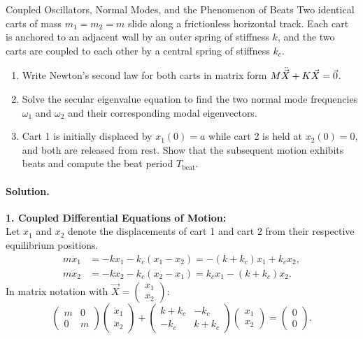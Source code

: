 \begin{workedexample}{Coupled Oscillators, Normal Modes, and the Phenomenon of Beats}
Two identical carts of mass $m_1 = m_2 = m$ slide along a frictionless horizontal track. Each cart is anchored to an adjacent wall by an outer spring of stiffness $k$, and the two carts are coupled to each other by a central spring of stiffness $k_c$.
\begin{enumerate}[leftmargin=1.4em,itemsep=3pt]
  \item Write Newton's second law for both carts in matrix form $M \ddot{\vec{X}} + K \vec{X} = \vec{0}$.
  \item Solve the secular eigenvalue equation to find the two normal mode frequencies $\omega_1$ and $\omega_2$ and their corresponding modal eigenvectors.
  \item Cart 1 is initially displaced by $x_1(0) = a$ while cart 2 is held at $x_2(0) = 0$, and both are released from rest. Show that the subsequent motion exhibits beats and compute the beat period $T_{\text{beat}}$.
\end{enumerate}

\paragraph{Solution.}
\textbf{1. Coupled Differential Equations of Motion:}\\
Let $x_1$ and $x_2$ denote the displacements of cart 1 and cart 2 from their respective equilibrium positions.
\begin{align*}
m \ddot{x}_1 &= -k x_1 - k_c (x_1 - x_2) = -(k + k_c) x_1 + k_c x_2, \\
m \ddot{x}_2 &= -k x_2 - k_c (x_2 - x_1) = k_c x_1 - (k + k_c) x_2.
\end{align*}
In matrix notation with $\vec{X} = \begin{pmatrix} x_1 \\ x_2 \end{pmatrix}$:
\[
\begin{pmatrix} m & 0 \\ 0 & m \end{pmatrix} \begin{pmatrix} \ddot{x}_1 \\ \ddot{x}_2 \end{pmatrix} + \begin{pmatrix} k + k_c & -k_c \\ -k_c & k + k_c \end{pmatrix} \begin{pmatrix} x_1 \\ x_2 \end{pmatrix} = \begin{pmatrix} 0 \\ 0 \end{pmatrix}.
\]


\end{workedexample}
